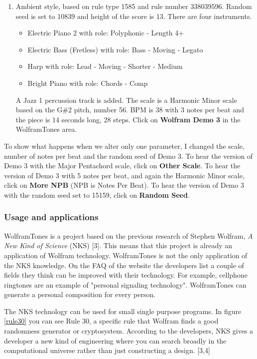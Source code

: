 \documentclass[12pt]{article}
\begin{document}
\begin{enumerate}
\item Ambient style, based on rule type 1585 and rule number 338039596. Random seed is set to 10839 and height of the score is 13.
There are four instruments.
\begin{itemize}
\item Electric Piano 2 with role: Polyphonic - Length 4+
\item Electric Bass (Fretless) with role: Bass - Moving - Legato
\item Harp with role: Lead - Moving - Shorter - Medium
\item Bright Piano with role: Chords - Comp
\end{itemize}
A Jazz 1 percussion track is added. The scale is a Harmonic Minor scale based on the G\#2 pitch, number 56. BPM is 38 with 3 notes per beat and the piece is 14 seconds long, 28 steps. Click on \textbf{Wolfram Demo 3} in the WolframTones area.
\end{enumerate}

To show what happens when we alter only one parameter, I changed the scale, number of notes per beat and the random seed of Demo 3. To hear the version of Demo 3 with the Major Pentachord scale, click on \textbf{Other Scale}. To hear the version of Demo 3 with 5 notes per beat, and again the Harmonic Minor scale, click on \textbf{More NPB} (NPB is Notes Per Beat). To hear the version of Demo 3 with the random seed set to 15159, click on \textbf{Random Seed}.

\subsubsection{Usage and applications}
 
WolframTones is a project based on the previous research of Stephen Wolfram, \textit{A New Kind of Science} (NKS) [3]. This means that this project is already an application of Wolfram technology. WolframTones is not the only application of the NKS knowledge. On the FAQ of the website the developers list a couple of fields they think can be improved with their technology. For example, cellphone ringtones are an example of "personal signaling technology". WolframTones can generate a personal composition for every person.
\newline

The NKS technology can be used for small single purpose programs. In figure \ref{rule30} you can see Rule 30, a specific rule that Wolfram finds a good randomness generator or cryptosystem. 
According to the developers, NKS gives a developer a new kind of engineering where you can search broadly in the computational universe rather than just constructing a design. [3,4] 
\end{document}
